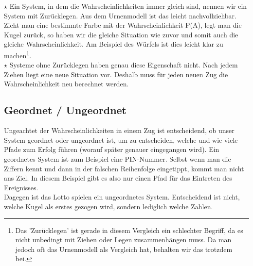 		\(\star\) Ein System, in dem die Wahrscheinlichkeiten immer gleich sind,
		nennen wir ein System mit Zurücklegen. Aus dem Urnenmodell ist das leicht
		nachvollziehbar. Zieht man eine bestimmte Farbe mit der Wahrscheinlichkeit
		P(A), legt man die Kugel zurück, so haben wir die gleiche Situation wie zuvor
		und somit auch die gleiche Wahrscheinlichkeit. Am Beispiel des Würfels ist dies
		leicht klar zu machen\footnote{Das 'Zurücklegen' ist gerade in diesem
		Vergleich ein schlechter Begriff, da es nicht unbedingt mit Ziehen oder Legen
		zusammenhängen muss. Da man jedoch oft das Urnenmodell als Vergleich hat,
		behalten wir das trotzdem bei.}.\\
		
		\(\star\) Systeme ohne Zurücklegen haben genau diese Eigenschaft nicht. Nach
		jedem Ziehen liegt eine neue Situation vor. Deshalb muss für jeden neuen Zug
		die Wahrscheinlichkeit neu berechnet werden.

	\subsection{Geordnet / Ungeordnet}
		Ungeachtet der Wahrscheinlichkeiten in einem Zug ist entscheidend, ob unser
		System geordnet oder ungeordnet ist, um zu entscheiden, welche und wie viele
		Pfade zum Erfolg führen (worauf später genauer eingegangen wird). Ein
		geordnetes System ist zum Beispiel eine PIN-Nummer. Selbst wenn man die
		Ziffern kennt und dann in der falschen Reihenfolge eingetippt, kommt man nicht
		ans Ziel. In diesem Beispiel gibt es also nur einen Pfad für das Eintreten des
		Ereignisses.\\
		Dagegen ist das Lotto spielen ein ungeordnetes System. Entscheidend ist nicht,
		welche Kugel als erstes gezogen wird, sondern lediglich welche Zahlen.
